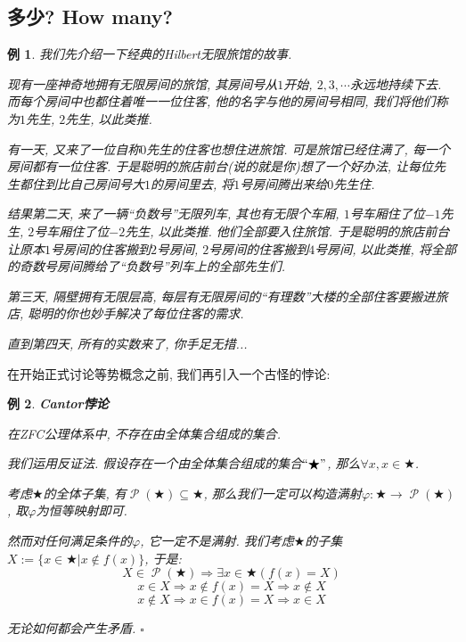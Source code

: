 \documentclass[UTF8]{ctexart}
\newcommand{\<}{\langle}
\renewcommand{\>}{\rangle}
\DeclareMathOperator{\PP}{\mathcal{P}}
\newtheorem{xmp}{例}[subsection]
\begin{document}
        \subsection{多少? How many? }
        
            \begin{xmp}
                我们先介绍一下经典的Hilbert无限旅馆的故事. 
    
                现有一座神奇地拥有无限房间的旅馆, 其房间号从$1$开始, $2,3,\cdots$永远地持续下去. 而每个房间中也都住着唯一一位住客, 他的名字与他的房间号相同, 我们将他们称为$1$先生, $2$先生, 以此类推. 
    
                有一天, 又来了一位自称$0$先生的住客也想住进旅馆. 可是旅馆已经住满了, 每一个房间都有一位住客. 于是聪明的旅店前台(说的就是你)想了一个好办法, 让每位先生都住到比自己房间号大$1$的房间里去, 将$1$号房间腾出来给$0$先生住. 

                结果第二天, 来了一辆``负数号''无限列车, 其也有无限个车厢, $1$号车厢住了位$-1$先生, $2$号车厢住了位$-2$先生, 以此类推. 他们全部要入住旅馆. 于是聪明的旅店前台让原本$1$号房间的住客搬到$2$号房间, $2$号房间的住客搬到$4$号房间, 以此类推, 将全部的奇数号房间腾给了``负数号''列车上的全部先生们. 

                第三天, 隔壁拥有无限层高, 每层有无限房间的``有理数''大楼的全部住客要搬进旅店, 聪明的你也妙手解决了每位住客的需求. 

                直到第四天, 所有的实数来了, 你手足无措...
            \end{xmp}

            在开始正式讨论等势概念之前, 我们再引入一个古怪的悖论: 

            \begin{xmp}
                \textbf{Cantor悖论}

                在ZFC公理体系中, 不存在由全体集合组成的集合. 

                我们运用反证法. 假设存在一个由全体集合组成的集合$``\bigstar"$, 那么$\forall x, x\in\bigstar$. 
                
                考虑$\bigstar$的全体子集, 有$\PP(\bigstar)\subseteq\bigstar$, 那么我们一定可以构造满射$\varphi:\bigstar\to\PP(\bigstar)$, 取$\varphi$为恒等映射即可. 
                
                然而对任何满足条件的$\varphi$, 它一定不是满射. 我们考虑$\bigstar$的子集$X:=\{x\in\bigstar|x\notin f(x)\}$, 于是: 
                \[X\in\PP(\bigstar)\Longrightarrow\exists x\in\bigstar(f(x)=X)\]
                \[x\in X\Longrightarrow x\notin f(x)=X\Longrightarrow x\notin X\]
                \[x\notin X\Longrightarrow x\in f(x)=X\Longrightarrow x\in X\]

                无论如何都会产生矛盾. $\square$
            \end{xmp}
            
\end{document}
